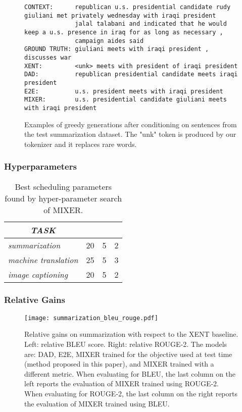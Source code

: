 \documentclass{article} \usepackage{iclr2016_conference,times}
\begin{document}
\begin{figure}[h!]
{\begin{verbatim}
CONTEXT:      republican u.s. presidential candidate rudy giuliani met privately wednesday with iraqi president 
              jalal talabani and indicated that he would keep a u.s. presence in iraq for as long as necessary , 
              campaign aides said
GROUND TRUTH: giuliani meets with iraqi president , discusses war
XENT:         <unk> meets with president of iraqi president
DAD:          republican presidential candidate meets iraqi president
E2E:          u.s. president meets with iraqi president
MIXER:        u.s. presidential candidate giuliani meets with iraqi president
\end{verbatim}
}
\caption{Examples of greedy generations after conditioning on sentences from the test summarization dataset. The "unk" token is produced by our tokenizer and it replaces rare words.} 
\label{fig:generation}
\end{figure}


\subsubsection{Hyperparameters}
\begin{table}[!h]
\caption{Best scheduling parameters found by hyper-parameter search of MIXER.}
\begin{tabular}{l || l | l | l}
      \multicolumn{1}{c||}{\emph{TASK} }  & 
      \multicolumn{1}{c|}{} & 
      \multicolumn{1}{c|}{} & \multicolumn{1}{c}{} \\
      \hline
      \hline
      {\em summarization} & 20 & 5 & 2  \\
      \hline
      {\em machine translation} & 25 & 5 & 3 \\
      \hline
      {\em image captioning} & 20 & 5 & 2  \\
    \end{tabular}
\label{tab:scheduling}
\end{table}

\subsubsection{Relative Gains}


\begin{figure}[!h]
\begin{center}
 \texttt{[image: summarization\_bleu\_rouge.pdf]}
 \end{center}
\caption{Relative gains on summarization with respect to the XENT baseline. Left: relative BLEU score. Right: relative ROUGE-2.
The models are: DAD, E2E, MIXER trained for the objective used at test time (method proposed in this paper), and MIXER trained with a different metric.
When evaluating for BLEU, the last column on the left reports the evaluation of MIXER trained using ROUGE-2.
When evaluating for ROUGE-2, the last column on the right reports the evaluation of MIXER trained using BLEU.}
\label{fig:summarization_bleu_rouge}
\end{figure}
\end{document}
